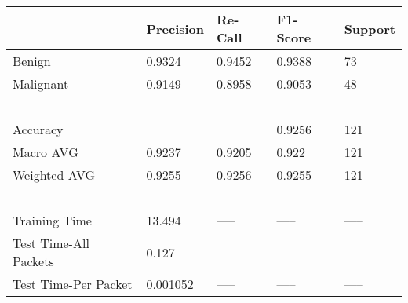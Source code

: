 \begin{tabular}{lllll}
\toprule
{} & Precision & Re-Call & F1-Score & Support \\
\midrule
Benign                &    0.9324 &  0.9452 &   0.9388 &      73 \\
Malignant             &    0.9149 &  0.8958 &   0.9053 &      48 \\
-----                 &     ----- &   ----- &    ----- &   ----- \\
Accuracy              &           &         &   0.9256 &     121 \\
Macro AVG             &    0.9237 &  0.9205 &    0.922 &     121 \\
Weighted AVG          &    0.9255 &  0.9256 &   0.9255 &     121 \\
-----                 &     ----- &   ----- &    ----- &   ----- \\
Training Time         &    13.494 &   ----- &    ----- &   ----- \\
Test Time-All Packets &     0.127 &   ----- &    ----- &   ----- \\
Test Time-Per Packet  &  0.001052 &   ----- &    ----- &   ----- \\
\bottomrule
\end{tabular}
